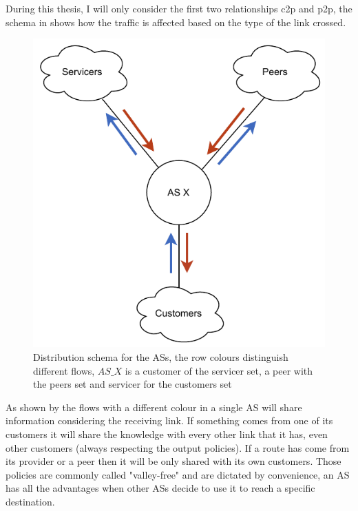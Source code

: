 During this thesis, I will only consider the first two relationships \ac{c2p} and
\ac{p2p}, the schema in  shows how the traffic is affected
based on the type of the link crossed.

\begin{figure}[ht]
    \centering
    \includegraphics[scale=0.75]{images/BGP/ASKnowledgeDistribution.pdf}
	\caption{Distribution schema for the \acp{AS}, the row colours distinguish
	different flows, $AS\_X$ is a customer of the servicer set, a peer with the
	peers set and servicer for the customers set}
    \label{fig:AS_flow}
\end{figure}


As shown by the flows with a different colour in  a single
\ac{AS} will share information considering the receiving link.
If something comes from one of its customers it will share the knowledge with
every other link that it has, even other customers (always respecting the output policies).
If a route has come from its provider or a peer then it will be only shared with 
its own customers.
Those policies are commonly called "valley-free" and are dictated by convenience, 
an \ac{AS} has all the advantages when
other \acp{AS} decide to use it to reach a specific destination.

